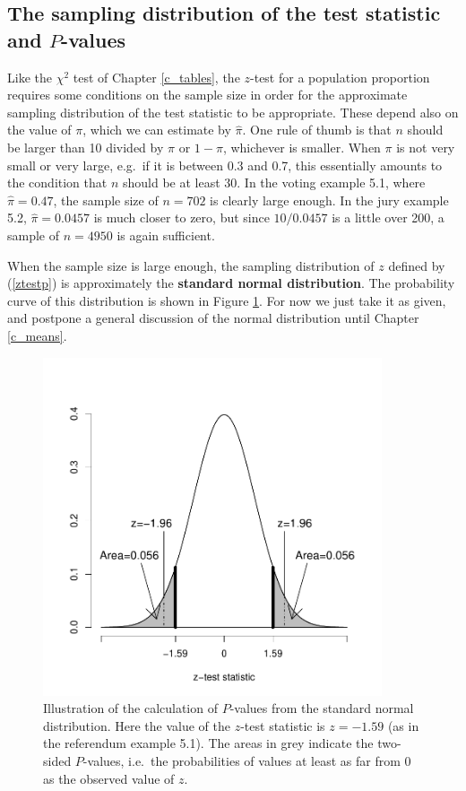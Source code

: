 \subsection{The sampling distribution of the test statistic and
$P$-values}
\label{ss_probs_test1sample_samplingd}

\label{p_thumbp}
Like the $\chi^{2}$ test of Chapter \ref{c_tables}, the $z$-test for a
population proportion requires some conditions on the sample size in
order for the approximate sampling distribution of the test statistic to
be appropriate. These depend also on the value of $\pi$, which we can
estimate by $\hat{\pi}$. One rule of thumb is that $n$ should be larger
than 10 divided by $\pi$ or $1-\pi$, whichever is smaller. When $\pi$ is
not very small or very large, e.g.\ if it is between 0.3 and 0.7, this
essentially amounts to the condition that $n$ should be at least 30. In
the voting example 5.1, where $\hat{\pi}=0.47$, the sample size of
$n=702$ is clearly large enough. In the jury example 5.2,
$\hat{\pi}=0.0457$ is much closer to zero, but since $10/0.0457$ is a
little over 200, a sample of $n=4950$ is again sufficient.

When the sample size is large enough, the sampling distribution of $z$
defined by (\ref{ztestp}) is approximately the \textbf{standard normal
distribution}. The probability curve of this distribution is shown in
Figure  \ref{f_pval_prob}. For now we just take it as given, and
postpone a general discussion of the normal distribution
until Chapter \ref{c_means}.

\begin{figure}[t]
\caption{
Illustration of the calculation of $P$-values from the standard normal
distribution. Here the value of the $z$-test statistic is $z=-1.59$ (as
in the referendum example 5.1). The areas in grey indicate the two-sided
$P$-values, i.e.\ the probabilities of values at least as far from 0 as
the observed value of $z$.
}
\label{f_pval_prob}
\begin{center}
\vspace*{-1ex}
\includegraphics[width=10cm]{pval_zp}
\end{center}
\vspace*{-4ex}
\end{figure}

